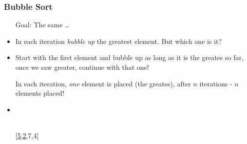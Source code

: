 \documentclass[final,handout]{beamer}
\begin{document}
\begin{frame}[fragile]
    \frametitle{Bubble Sort}

    \begin{itemize}
        \item[Goal:] The same \dots

        \item<2->[Intuition:] In each iteration \emph{bubble up} the greatest element.
            But which one is it?

        \item<3->[Solution:] 
            Start with the first element and bubble up as long as it is the
            greates so far, once we saw greater, continue with that one!
        
            \pause
            In each iteration, \emph{one} element is placed (the greates), after
            $n$ iterations - $n$ elements placed!

        \item<4->[Example:] ~\\ {\tt \small
                
                ~\only<5>{$\color{red}\downarrow$}
                ~~~~~~~~~~~~~~
                ~~~~~~~~~~~~~~
                ~~~~~~~~~~~~~~~\\

                [\underline{5,2},7,4]
                ~\\

                ~
                ~~~~~~~~~~~~~~
                ~~~~~~~~~~~~~~
                ~~~~~~~~~~~~~~~\\

                ~\\
                
                ~
                ~~~~~~~~~~~~~~
                ~~~~~~~~~~~~~~
                ~~~~~~~~~~~~~~~\\

}
\end{itemize}
\end{frame}
\end{document}
